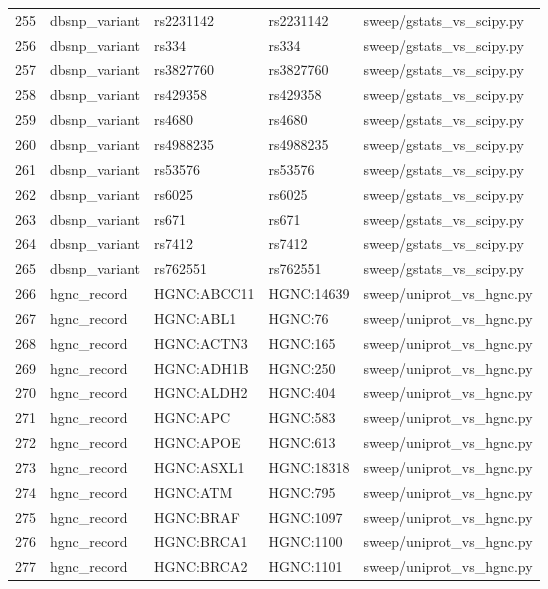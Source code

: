 {\begin{longtable}{rllp{3.2cm}p{4.2cm}}
255 & dbsnp\_variant & rs2231142 & rs2231142 & sweep/gstats\_vs\_scipy.py\\
256 & dbsnp\_variant & rs334 & rs334 & sweep/gstats\_vs\_scipy.py\\
257 & dbsnp\_variant & rs3827760 & rs3827760 & sweep/gstats\_vs\_scipy.py\\
258 & dbsnp\_variant & rs429358 & rs429358 & sweep/gstats\_vs\_scipy.py\\
259 & dbsnp\_variant & rs4680 & rs4680 & sweep/gstats\_vs\_scipy.py\\
260 & dbsnp\_variant & rs4988235 & rs4988235 & sweep/gstats\_vs\_scipy.py\\
261 & dbsnp\_variant & rs53576 & rs53576 & sweep/gstats\_vs\_scipy.py\\
262 & dbsnp\_variant & rs6025 & rs6025 & sweep/gstats\_vs\_scipy.py\\
263 & dbsnp\_variant & rs671 & rs671 & sweep/gstats\_vs\_scipy.py\\
264 & dbsnp\_variant & rs7412 & rs7412 & sweep/gstats\_vs\_scipy.py\\
265 & dbsnp\_variant & rs762551 & rs762551 & sweep/gstats\_vs\_scipy.py\\
266 & hgnc\_record & HGNC:ABCC11 & HGNC:14639 & sweep/uniprot\_vs\_hgnc.py\\
267 & hgnc\_record & HGNC:ABL1 & HGNC:76 & sweep/uniprot\_vs\_hgnc.py\\
268 & hgnc\_record & HGNC:ACTN3 & HGNC:165 & sweep/uniprot\_vs\_hgnc.py\\
269 & hgnc\_record & HGNC:ADH1B & HGNC:250 & sweep/uniprot\_vs\_hgnc.py\\
270 & hgnc\_record & HGNC:ALDH2 & HGNC:404 & sweep/uniprot\_vs\_hgnc.py\\
271 & hgnc\_record & HGNC:APC & HGNC:583 & sweep/uniprot\_vs\_hgnc.py\\
272 & hgnc\_record & HGNC:APOE & HGNC:613 & sweep/uniprot\_vs\_hgnc.py\\
273 & hgnc\_record & HGNC:ASXL1 & HGNC:18318 & sweep/uniprot\_vs\_hgnc.py\\
274 & hgnc\_record & HGNC:ATM & HGNC:795 & sweep/uniprot\_vs\_hgnc.py\\
275 & hgnc\_record & HGNC:BRAF & HGNC:1097 & sweep/uniprot\_vs\_hgnc.py\\
276 & hgnc\_record & HGNC:BRCA1 & HGNC:1100 & sweep/uniprot\_vs\_hgnc.py\\
277 & hgnc\_record & HGNC:BRCA2 & HGNC:1101 & sweep/uniprot\_vs\_hgnc.py\\

\end{longtable}}
